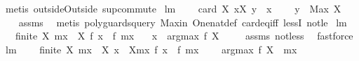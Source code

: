 \begin{isabellebody}
\isatagproof
{}\isamarkupfalse%
\ {\isacharparenleft}metis\ outsideOutside\ sup{\isacharunderscore}commute{\isacharparenright}%
\endisatagproof
{\isafoldproof}%
%
\isadelimproof
%
\endisadelimproof
%
\isamarkuptrue%
\isamarkupfalse%
\ lm{}{}{}{\isacharcolon}\ \isanewline
\ \ \ {\isachardoublequoteopen}card\ X{\isasymge}{}{\isachardoublequoteclose}\ {\isachardoublequoteopen}{\isasymforall}x{\isasymin}X{\isachardot}\ y\ {\isachargreater}\ x{\isachardoublequoteclose}\ \isanewline
\ \ \ {\isachardoublequoteopen}y\ {\isachargreater}\ Max\ X{\isachardoublequoteclose}\ \isanewline
%
\isadelimproof
\ \ %
\endisadelimproof
%
\isatagproof
{}\isamarkupfalse%
\ assms\ \isamarkupfalse%
\ {\isacharparenleft}metis\ {\isacharparenleft}poly{\isacharunderscore}guards{\isacharunderscore}query{\isacharparenright}\ Max{\isacharunderscore}in\ One{\isacharunderscore}nat{\isacharunderscore}def\ card{\isacharunderscore}eq{\isacharunderscore}{}{\isacharunderscore}iff\ lessI\ not{\isacharunderscore}le{\isacharparenright}%
\endisatagproof
{\isafoldproof}%
%
\isadelimproof
\isanewline
%
\endisadelimproof
\isanewline
\isanewline
{}\isamarkupfalse%
\ lm{}{}{}{\isacharcolon}\ \isanewline
\ \ \ {\isachardoublequoteopen}finite\ X{\isachardoublequoteclose}\ {\isachardoublequoteopen}mx\ {\isasymin}\ X{\isachardoublequoteclose}\ {\isachardoublequoteopen}f\ x\ {\isacharless}\ f\ mx{\isachardoublequoteclose}\ \isanewline
\ \ x\ {\isasymnotin}\ argmax\ f\ X{\isachardoublequoteclose}\ \isanewline
%
\isadelimproof
\ \ %
\endisadelimproof
%
\isatagproof
{}\isamarkupfalse%
\ assms\ not{\isacharunderscore}less\ \isamarkupfalse%
\ fastforce%
\endisatagproof
{\isafoldproof}%
%
\isadelimproof
\isanewline
%
\endisadelimproof
\isanewline
{}\isamarkupfalse%
\ lm{}{}{}{\isacharcolon}\ \isanewline
\ \ \ {\isachardoublequoteopen}finite\ X{\isachardoublequoteclose}\ {\isachardoublequoteopen}mx\ {\isasymin}\ X{\isachardoublequoteclose}\ {\isachardoublequoteopen}{\isasymforall}x\ {\isasymin}\ X{\isacharminus}{\isacharbraceleft}mx{\isacharbraceright}{\isachardot}\ f\ x\ {\isacharless}\ f\ mx{\isachardoublequoteclose}\ \isanewline
\ \ \ {\isachardoublequoteopen}argmax\ f\ X\ {\isasymsubseteq}\ {\isacharbraceleft}mx{\isacharbraceright}{\isachardoublequoteclose}\isanewline

\end{isabellebody}
